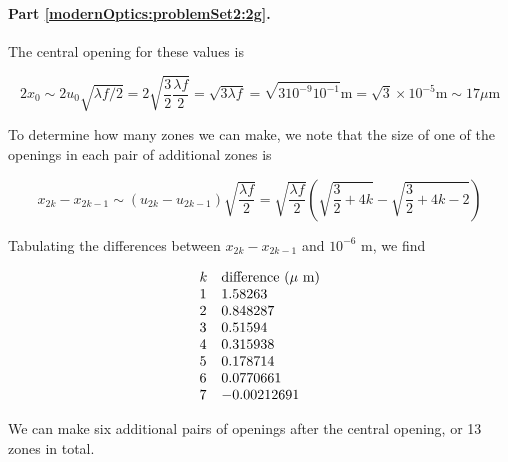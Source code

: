 {\paragraph{Part \ref{modernOptics:problemSet2:2g}.  }

The central opening for these values is

\begin{dmath}\label{eqn:modernOptics:ProblemSet2:P2:340}
2 x_0 
\sim 2 u_0 \sqrt{ \lambda f/2 }
= 2 \sqrt{ \frac{3}{2} \frac{\lambda f}{2} }
= \sqrt{ 3 \lambda f }
= \sqrt{ 3 10^{-9} 10^{-1} } \text{m}
= \sqrt{ 3 } \times 10^{-5} \text{m}
\sim 17 \mu \text{m}
\end{dmath}

To determine how many zones we can make, we note that the size of one of the openings in each pair of additional zones is

\begin{dmath}\label{eqn:modernOptics:ProblemSet2:P2:360}
x_{2k} - x_{2k-1} 
\sim 
(u_{2k} - u_{2k-1} ) 
\sqrt{ \frac{\lambda f}{2} } 
=
\sqrt{ \frac{\lambda f}{2} } 
\left( 
\sqrt{ \frac{3}{2} + 4 k }
-\sqrt{ \frac{3}{2} + 4 k - 2 }
\right)
\end{dmath}

Tabulating the differences between $x_{2k} - x_{2k-1}$ and $10^{-6}$ m, we find

\begin{equation}\label{eqn:modernOptics:ProblemSet2:P2:380}
\begin{array}{l l}
k & \text{difference ($\mu$ m)} \\
1 & 1.58263 \\
2 & 0.848287 \\
3 & 0.51594 \\
4 & 0.315938 \\
5 & 0.178714 \\
6 & 0.0770661 \\
7 & -0.00212691 
\end{array}
\end{equation}

We can make six additional pairs of openings after the central opening, or 13 zones in total.

}
